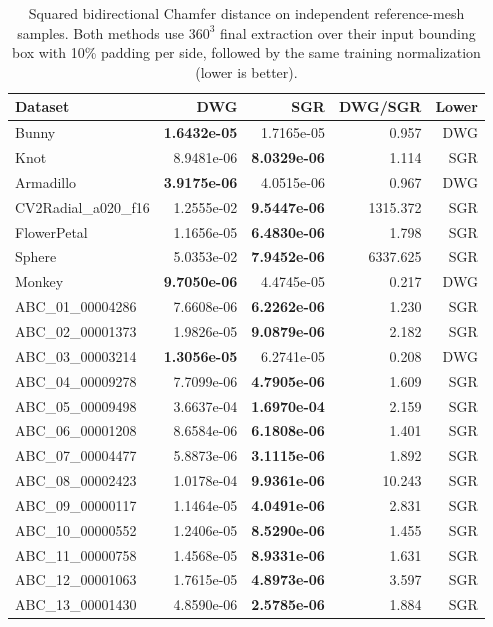 \begin{table}[t]
\centering
\caption{Squared bidirectional Chamfer distance on independent reference-mesh samples. Both methods use $360^3$ final extraction over their input bounding box with 10\% padding per side, followed by the same training normalization (lower is better).}
\label{tab:dwg-chamfer}
\begin{tabular}{lrrrr}
\toprule
Dataset & DWG & SGR & DWG/SGR & Lower \\
\midrule
Bunny & \textbf{1.6432e-05} & 1.7165e-05 & 0.957 & DWG \\
Knot & 8.9481e-06 & \textbf{8.0329e-06} & 1.114 & SGR \\
Armadillo & \textbf{3.9175e-06} & 4.0515e-06 & 0.967 & DWG \\
CV2Radial\_a020\_f16 & 1.2555e-02 & \textbf{9.5447e-06} & 1315.372 & SGR \\
FlowerPetal & 1.1656e-05 & \textbf{6.4830e-06} & 1.798 & SGR \\
Sphere & 5.0353e-02 & \textbf{7.9452e-06} & 6337.625 & SGR \\
Monkey & \textbf{9.7050e-06} & 4.4745e-05 & 0.217 & DWG \\
ABC\_01\_00004286 & 7.6608e-06 & \textbf{6.2262e-06} & 1.230 & SGR \\
ABC\_02\_00001373 & 1.9826e-05 & \textbf{9.0879e-06} & 2.182 & SGR \\
ABC\_03\_00003214 & \textbf{1.3056e-05} & 6.2741e-05 & 0.208 & DWG \\
ABC\_04\_00009278 & 7.7099e-06 & \textbf{4.7905e-06} & 1.609 & SGR \\
ABC\_05\_00009498 & 3.6637e-04 & \textbf{1.6970e-04} & 2.159 & SGR \\
ABC\_06\_00001208 & 8.6584e-06 & \textbf{6.1808e-06} & 1.401 & SGR \\
ABC\_07\_00004477 & 5.8873e-06 & \textbf{3.1115e-06} & 1.892 & SGR \\
ABC\_08\_00002423 & 1.0178e-04 & \textbf{9.9361e-06} & 10.243 & SGR \\
ABC\_09\_00000117 & 1.1464e-05 & \textbf{4.0491e-06} & 2.831 & SGR \\
ABC\_10\_00000552 & 1.2406e-05 & \textbf{8.5290e-06} & 1.455 & SGR \\
ABC\_11\_00000758 & 1.4568e-05 & \textbf{8.9331e-06} & 1.631 & SGR \\
ABC\_12\_00001063 & 1.7615e-05 & \textbf{4.8973e-06} & 3.597 & SGR \\
ABC\_13\_00001430 & 4.8590e-06 & \textbf{2.5785e-06} & 1.884 & SGR \\

\end{tabular}
\end{table}

